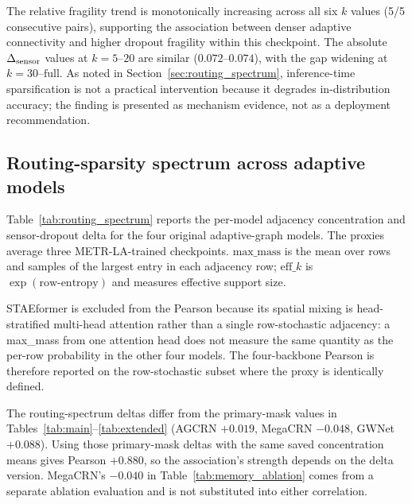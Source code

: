 The relative fragility trend is monotonically increasing across all six $k$ values
(5/5 consecutive pairs), supporting the association between denser adaptive connectivity
and higher dropout fragility within this checkpoint.
The absolute $\Delta_{\text{sensor}}$ values at $k{=}5$--$20$ are similar ($0.072$--$0.074$),
with the gap widening at $k{=}30$--$\text{full}$.
As noted in Section~\ref{sec:routing_spectrum}, inference-time sparsification is not
a practical intervention because it degrades in-distribution accuracy; the finding
is presented as mechanism evidence, not as a deployment recommendation.

\subsection{Routing-sparsity spectrum across adaptive models}
\label{sec:appendix_routing_spectrum}

Table~\ref{tab:routing_spectrum} reports the per-model adjacency concentration
and sensor-dropout delta for the four original adaptive-graph models. The proxies average
three METR-LA-trained checkpoints. $\text{max\_mass}$ is the mean over rows and
samples of the largest entry in each adjacency row; $\text{eff\_}k$ is
$\exp(\text{row-entropy})$ and measures effective support size.

STAEformer is excluded from the Pearson because its spatial mixing is
head-stratified multi-head attention rather than a single row-stochastic
adjacency: a max\_mass from one attention head does not measure the same quantity as the per-row probability in the other four models.
The four-backbone Pearson is therefore reported on the row-stochastic
subset where the proxy is identically defined.

The routing-spectrum deltas differ from the primary-mask values in
Tables~\ref{tab:main}--\ref{tab:extended}
(AGCRN $+0.019$, MegaCRN $-0.048$, GWNet $+0.088$). Using those primary-mask
deltas with the same saved concentration means gives Pearson $+0.880$,
so the association's strength depends on the delta version. MegaCRN's
$-0.040$ in Table~\ref{tab:memory_ablation} comes from a separate ablation
evaluation and is not substituted into either correlation.

